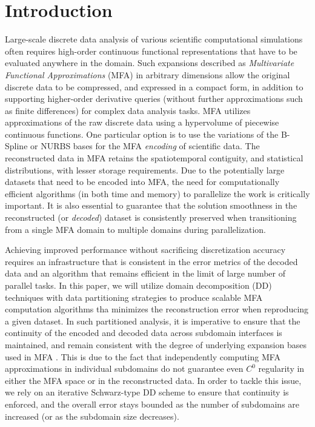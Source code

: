 \section{Introduction}
\label{sec:introduction}

Large-scale discrete data analysis of various scientific computational simulations often requires high-order continuous functional representations that have to be evaluated anywhere in the domain. Such expansions described as {\em Multivariate Functional Approximations} (MFA) \cite{de1983approximation, functional-analysis} in arbitrary dimensions allow the original discrete data to be compressed, and expressed in a compact form, in addition to supporting higher-order derivative queries (without further approximations such as finite differences) for complex data analysis tasks. MFA utilizes approximations of the raw discrete data using a hypervolume of piecewise continuous functions. One particular option is to use the variations of the B-Spline or NURBS bases \cite{nurbs-book, peterka-mfa} for the MFA {\em encoding} of scientific data. The reconstructed data in MFA retains the spatiotemporal contiguity, and statistical distributions, with lesser storage requirements. Due to the potentially large datasets that need to be encoded into MFA, the need for computationally efficient algorithms (in both time and memory) to parallelize the work is critically important. It is also essential to guarantee that the solution smoothness in the reconstructed (or {\em decoded}) dataset is consistently preserved when transitioning from a single MFA domain to multiple domains during parallelization.

Achieving improved performance without sacrificing discretization accuracy requires an infrastructure that is consistent in the error metrics of the decoded data and an algorithm that remains efficient in the limit of large number of parallel tasks. In this paper, we will utilize domain decomposition (DD) techniques \cite{smith-ddm} with data partitioning strategies to produce scalable MFA computation algorithms tha minimizes the reconstruction error when reproducing a given dataset. In such partitioned analysis, it is imperative to ensure that the continuity of the encoded and decoded data across subdomain interfaces is maintained, and remain consistent with the degree of underlying expansion bases used in MFA \cite{peterka-mfa}.  This is due to the fact that independently computing MFA approximations in individual subdomains do not guarantee even $C^0$ regularity in either the MFA space or in the reconstructed data. 
In order to tackle this issue, we rely on an iterative Schwarz-type DD scheme to ensure that continuity is enforced, and the overall error stays bounded as the number of subdomains are increased (or as the subdomain size decreases).

